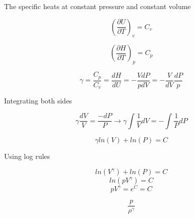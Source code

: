 The specific heats at constant pressure and constant volume 

\[\left(\frac{\partial U}{\partial T}\right)_v = C_v\]

\[\left(\frac{\partial H}{\partial T}\right)_p = C_p\]

\[\gamma = \frac{C_p}{C_v} = \frac{dH}{dU} = -\frac{VdP}{pdV} = -\frac{V}{dV}\frac{dP}{p}\]

Integrating both sides

\[\gamma \frac{dV}{V} = \frac{-dP}{P} \rightarrow \gamma \int \frac{1}{V} dV = - \int \frac{1}{P} dP\]

\[\gamma ln(V) + ln(P) = C\]

Using log rules

\[ln(V^\gamma) + ln(P) = C\]
 \[ln(pV^\gamma) = C \]
 \[pV^\gamma = e^C = C\]
 
 \[\frac{p}{\rho^\gamma}\]
 





